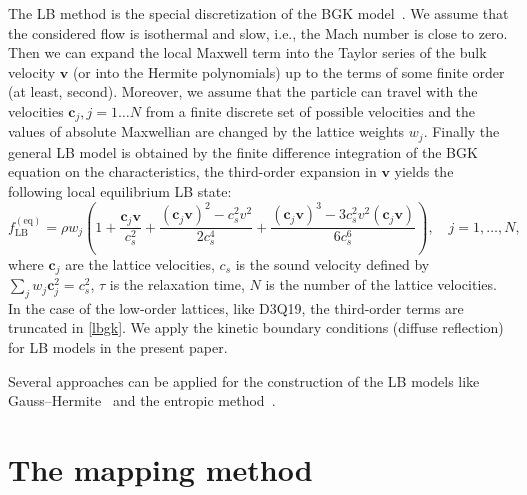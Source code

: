 \documentclass[]{elsarticle} %
\newcommand{\bv}{\boldsymbol{v}}
\newcommand{\bc}{\boldsymbol{c}}
\newcommand{\equil}[1]{#1^\mathrm{(eq)}}
\begin{document}
{The LB method is the special discretization of the BGK model~\cite{Succi2001}.
We assume that the considered flow is isothermal and slow, i.e., the Mach number is close to zero.
Then we can expand the local Maxwell term into the Taylor series of the bulk velocity $\bv$ (or into the Hermite polynomials)
up to the terms of some finite order (at least, second).
Moreover, we assume that the particle can travel with the velocities $\bc_{j}, j=1 \ldots N$ from a finite discrete set of possible velocities
and the values of absolute Maxwellian are changed by the lattice weights $w_j$.
Finally the general LB model is obtained by the finite difference integration of the BGK equation on the characteristics,
the third-order expansion in $\bv$ yields the following local equilibrium LB state:
\begin{equation}\label{lbgk}
    \equil{f}_\mathrm{LB} = \rho w_j\left(1+ \frac{\bc_j\bv}{c_s^2}+\frac{(\bc_j\bv)^2-c_s^2v^2}{2c_s^4}
    + \frac{(\bc_j\bv)^3-3c_s^2 v^2(\bc_j\bv)}{6c_s^6}\right), \quad j=1,\ldots,N,
\end{equation}
where $\bc_j$ are the lattice velocities, $c_s$ is the sound velocity defined by $\sum_jw_j\bc^2_j=c_s^2$,
$\tau$ is the relaxation time, $N$ is the number of the lattice velocities.
In the case of the low-order lattices, like D3Q19, the third-order terms are truncated in \eqref{lbgk}.
We apply the kinetic boundary conditions (diffuse reflection)~\cite{Ansumali2002} for LB models in the present paper.

Several approaches can be applied for the construction of the LB models like Gauss--Hermite~\cite{He1997, Shan1998, Shan2006, Shan2010}
and the entropic method~\cite{Karlin1999, Chikatamarla2006, Chikatamarla2009}.

\section{The mapping method}\label{sec:mapping}

}
\end{document}
